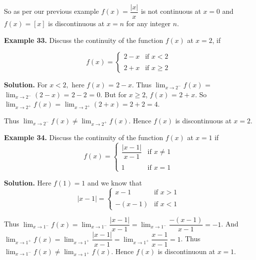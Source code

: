 \documentclass[../../main.tex]{subfiles}
\begin{document}
So as per our previous example $f(x)=\dfrac{|x|}{x}$ is not continuous at $x=0$ and $f(x)= [x]$ is discontinuous at $x=n$ for any integer $n$.

\vspace{0.2cm}
\textbf{Example 33.}
\vspace{0.2cm}
Discuss the continuity of the function ${f(x)}$ at $x=2$, if 

\begin{equation*}
    f(x) =
\begin{cases}
    2-x     & \text{if    }      x < 2 \\\\
    2+x   & \text{if    }        x \geq 2
\end{cases}
\end{equation*}

\textbf{Solution.} For $x < 2,$ here $f(x)$ = $2-x$. Thus $\lim_{x\rightarrow 2^-}{f(x)}$ = $\lim_{x\rightarrow 2^-}{(2-x)}$ = $2-2$ = $0$. But for $x\geq 2$, $f(x)$ = $2+x$. So $\lim_{x\rightarrow 2^+}{f(x)}$ = $\lim_{x\rightarrow 2^+}{(2+x)} = 2+2 = 4$. 

Thus $\lim_{x\rightarrow 2^-}{f(x)} \neq \lim_{x\rightarrow 2^+}{f(x)}$. Hence $f(x)$ is discontinuous at $x = 2$.

\vspace{0.2cm}
\textbf{Example 34.}
\vspace{0.2cm}
Discuss the continuity of the function $f(x)$ at $x=1$ if 
\begin{equation*}
    f(x) =
\begin{cases}
    \dfrac{|x-1|}{x-1}     & \text{if    }      x \neq 1 \\\\
    1   & \text{if    }        x = 1
\end{cases}
\end{equation*}

\textbf{Solution.} Here $f(1) = 1$ and we know that 
\begin{equation*}
    |x-1| =
\begin{cases}
    x-1     & \text{if    }      x > 1 \\\\
    -(x-1)   & \text{if    }        x < 1
\end{cases}
\end{equation*}

Thus $\lim_{x\rightarrow 1^-}f(x) = \lim_{x\rightarrow 1^-}{\dfrac{|x-1|}{x-1}} = \lim_{x\rightarrow 1^-}{\dfrac{-(x-1)}{x-1}} = -1$. And $\lim_{x\rightarrow 1^+}f(x) = \lim_{x\rightarrow 1^+}{\dfrac{|x-1|}{x-1}} = \lim_{x\rightarrow 1^+}{\dfrac{x-1}{x-1}} = 1$. Thus $\lim_{x\rightarrow 1^-}f(x) \neq  \lim_{x\rightarrow 1^+}{f(x)}$. Hence $f(x)$ is discontinuoun at $x=1$.
\end{document}
